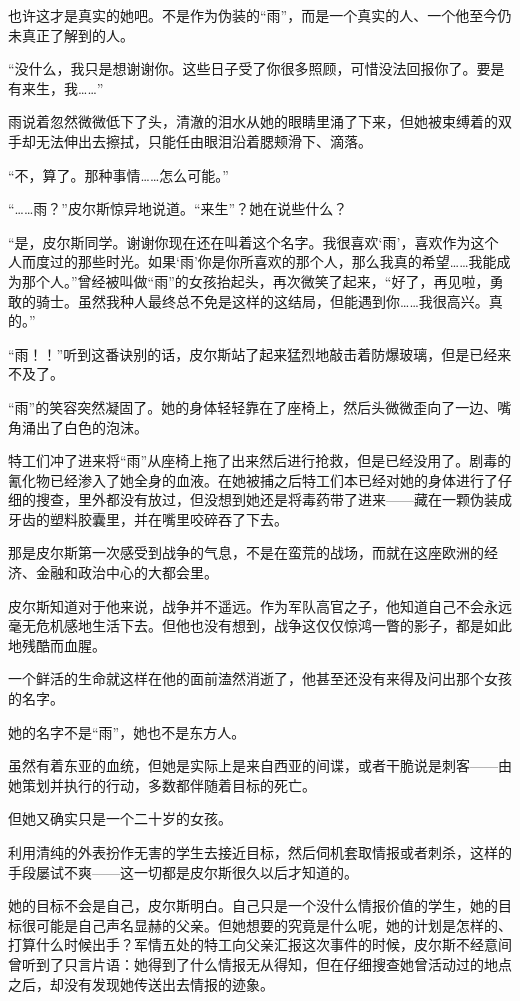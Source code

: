 也许这才是真实的她吧。不是作为伪装的“雨”，而是一个真实的人、一个他至今仍未真正了解到的人。

“没什么，我只是想谢谢你。这些日子受了你很多照顾，可惜没法回报你了。要是有来生，我……”

雨说着忽然微微低下了头，清澈的泪水从她的眼睛里涌了下来，但她被束缚着的双手却无法伸出去擦拭，只能任由眼泪沿着腮颊滑下、滴落。

“不，算了。那种事情……怎么可能。”

“……雨？”皮尔斯惊异地说道。“来生”？她在说些什么？

“是，皮尔斯同学。谢谢你现在还在叫着这个名字。我很喜欢‘雨’，喜欢作为这个人而度过的那些时光。如果‘雨’你是你所喜欢的那个人，那么我真的希望……我能成为那个人。”曾经被叫做“雨”的女孩抬起头，再次微笑了起来，“好了，再见啦，勇敢的骑士。虽然我种人最终总不免是这样的这结局，但能遇到你……我很高兴。真的。”

“雨！！”听到这番诀别的话，皮尔斯站了起来猛烈地敲击着防爆玻璃，但是已经来不及了。

“雨”的笑容突然凝固了。她的身体轻轻靠在了座椅上，然后头微微歪向了一边、嘴角涌出了白色的泡沫。

特工们冲了进来将“雨”从座椅上拖了出来然后进行抢救，但是已经没用了。剧毒的氰化物已经渗入了她全身的血液。在她被捕之后特工们本已经对她的身体进行了仔细的搜查，里外都没有放过，但没想到她还是将毒药带了进来——藏在一颗伪装成牙齿的塑料胶囊里，并在嘴里咬碎吞了下去。

那是皮尔斯第一次感受到战争的气息，不是在蛮荒的战场，而就在这座欧洲的经济、金融和政治中心的大都会里。

皮尔斯知道对于他来说，战争并不遥远。作为军队高官之子，他知道自己不会永远毫无危机感地生活下去。但他也没有想到，战争这仅仅惊鸿一瞥的影子，都是如此地残酷而血腥。

一个鲜活的生命就这样在他的面前溘然消逝了，他甚至还没有来得及问出那个女孩的名字。

她的名字不是“雨”，她也不是东方人。

虽然有着东亚的血统，但她是实际上是来自西亚的间谍，或者干脆说是刺客——由她策划并执行的行动，多数都伴随着目标的死亡。

但她又确实只是一个二十岁的女孩。

利用清纯的外表扮作无害的学生去接近目标，然后伺机套取情报或者刺杀，这样的手段屡试不爽——这一切都是皮尔斯很久以后才知道的。

她的目标不会是自己，皮尔斯明白。自己只是一个没什么情报价值的学生，她的目标很可能是自己声名显赫的父亲。但她想要的究竟是什么呢，她的计划是怎样的、打算什么时候出手？军情五处的特工向父亲汇报这次事件的时候，皮尔斯不经意间曾听到了只言片语：她得到了什么情报无从得知，但在仔细搜查她曾活动过的地点之后，却没有发现她传送出去情报的迹象。

